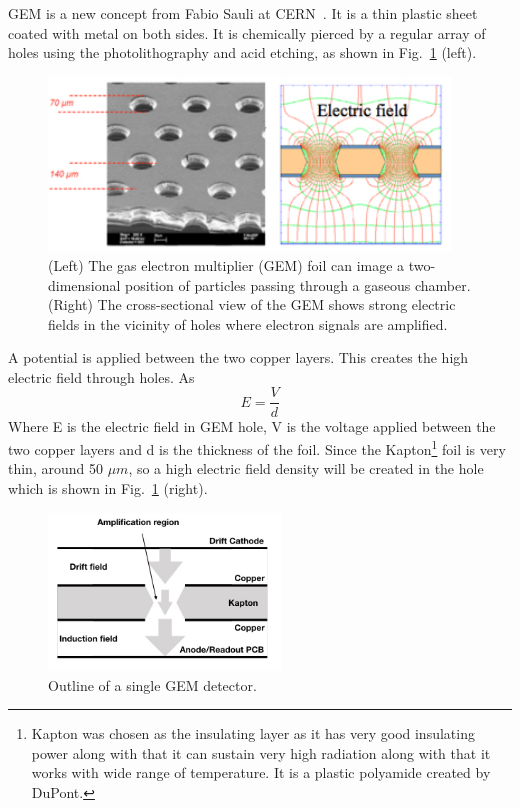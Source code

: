 GEM is a new concept from Fabio Sauli at CERN~\cite{Sauli1997}.
It is a thin plastic sheet coated with metal on both sides. It is chemically pierced by a regular array of holes using the photolithography and acid etching, as shown in Fig.~\ref{fig:gem} (left).
\begin{figure}[!htbp]
    \centering
    \includegraphics[width=0.95\textwidth]{figures/GEM/KEKDTP3.jpg}
    \caption{(Left) The gas electron multiplier (GEM) foil can image a two-dimensional position of particles passing through a gaseous chamber. (Right) The cross-sectional view of the GEM shows strong electric fields in the vicinity of holes where electron signals are amplified.}
    \label{fig:gem}
\end{figure}

A potential is applied between the two copper layers. This creates the high electric field through holes. As
\begin{equation}
    E = \frac{V}{d}
\end{equation}
Where E is the electric field in GEM hole, V is the voltage applied between the two copper layers and d is the thickness of the foil. Since the Kapton\footnote{Kapton was chosen as the insulating layer as it has very good insulating power along with that it can sustain very high radiation along with that it works with wide range of temperature. It is a plastic polyamide created by DuPont.} foil is very thin, around 50 $\mu m$, so a high electric field density will be created in the hole which is shown in Fig.~\ref{fig:gem} (right).
\begin{figure}[htbp]
    \centering
    \includegraphics[width=0.55\textwidth]{figures/GEM/SingleGEM_Detector.jpeg}
    \caption{Outline of a single GEM detector.}
    \label{fig:gemOutline}
\end{figure}

